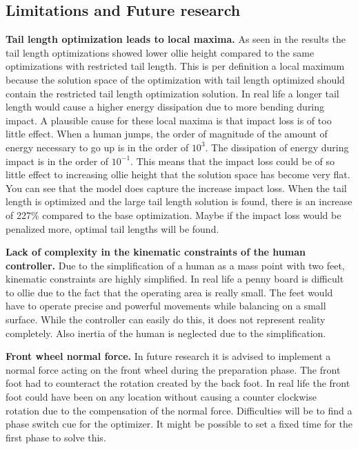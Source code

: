 \documentclass[default,iicol]{sn-jnl}
\begin{document}
\subsection{Limitations and Future research}
\noindent\textbf{Tail length optimization leads to local maxima.} As seen in the results the tail length optimizations showed lower ollie height compared to the same optimizations with restricted tail length. This is per definition a local maximum because the solution space of the optimization with tail length optimized should contain the restricted tail length optimization solution. In real life a longer tail length would cause a higher energy dissipation due to more bending during impact. A plausible cause for these local maxima is that impact loss is of too little effect. When a human jumps, the order of magnitude of the amount of energy necessary to go up is in the order of $10^3$. The dissipation of energy during impact is in the order of $10^{-1}$. This means that the impact loss could be of so little effect to increasing ollie height that the solution space has become very flat. You can see that the model does capture the increase impact loss. When the tail length is optimized and the large tail length solution is found, there is an increase of 227\% compared to the base optimization. Maybe if the impact loss would be penalized more, optimal tail lengths will be found.
 
\noindent\textbf{Lack of complexity in the kinematic constraints of the human controller.} Due to the simplification of a human as a mass point with two feet, kinematic constraints are highly simplified. In real life a penny board is difficult to ollie due to the fact that the operating area is really small. The feet would have to operate precise and powerful movements while balancing on a small surface. While the controller can easily do this, it does not represent reality completely. Also inertia of the human is neglected due to the simplification.

\noindent\textbf{Front wheel normal force.} In future research it is advised to implement a normal force acting on the front wheel during the preparation phase. The front foot had to counteract the rotation created by the back foot. In real life the front foot could have been on any location without causing a counter clockwise rotation due to the compensation of the normal force. Difficulties will be to find a phase switch cue for the optimizer. It might be possible to set a fixed time for the first phase to solve this.
\end{document}
